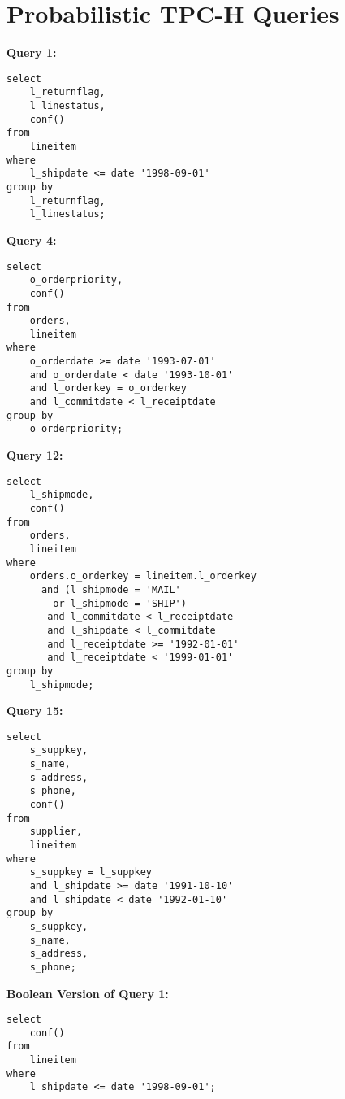 \chapter{Probabilistic TPC-H Queries} 
\label{app:tpch}

\textbf{\large{Query 1:}}

\begin{verbatim}
select 
    l_returnflag, 
    l_linestatus, 
    conf() 
from 
    lineitem 
where 
    l_shipdate <= date '1998-09-01' 
group by 
    l_returnflag, 
    l_linestatus;
\end{verbatim}

\noindent
\textbf{\large{Query 4:}}

\begin{verbatim}
select
    o_orderpriority,
    conf()
from
    orders,
    lineitem
where
    o_orderdate >= date '1993-07-01'
    and o_orderdate < date '1993-10-01'
    and l_orderkey = o_orderkey
    and l_commitdate < l_receiptdate
group by
    o_orderpriority;
\end{verbatim}

\noindent
\textbf{\large{Query 12:}}

\begin{verbatim}
select
    l_shipmode,
    conf()
from
    orders,
    lineitem
where
    orders.o_orderkey = lineitem.l_orderkey
      and (l_shipmode = 'MAIL' 
        or l_shipmode = 'SHIP')
       and l_commitdate < l_receiptdate
       and l_shipdate < l_commitdate
       and l_receiptdate >= '1992-01-01'
       and l_receiptdate < '1999-01-01'
group by
    l_shipmode;

\end{verbatim}

\noindent
\textbf{\large{Query 15:}}

\begin{verbatim}
select
    s_suppkey,
    s_name,
    s_address,
    s_phone,
    conf()
from
    supplier,
    lineitem
where
    s_suppkey = l_suppkey
    and l_shipdate >= date '1991-10-10'
    and l_shipdate < date '1992-01-10'
group by
    s_suppkey,
    s_name,
    s_address,
    s_phone;

\end{verbatim}

\noindent
\textbf{\large{Boolean Version of Query 1:}}

\begin{verbatim}
select 
    conf()
from 
    lineitem 
where 
    l_shipdate <= date '1998-09-01';
\end{verbatim}

